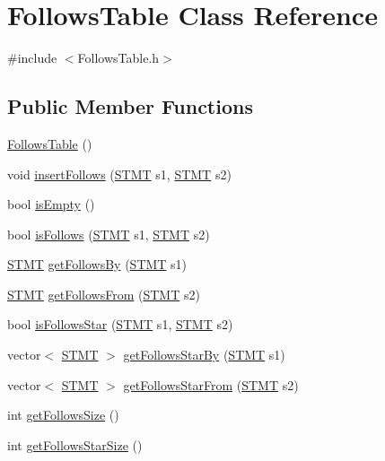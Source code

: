\hypertarget{class_follows_table}{\section{Follows\-Table Class Reference}
\label{class_follows_table}
}


{\ttfamily \#include $<$Follows\-Table.\-h$>$}

\subsection*{Public Member Functions}
\begin{DoxyCompactItemize}
\item 
\hyperlink{class_follows_table_a3f8037760cee7e5dc50a2df832f6c4ad}{Follows\-Table} ()
\item 
void \hyperlink{class_follows_table_a7bea1745b1f8b37e9ed96f5159116b8b}{insert\-Follows} (\hyperlink{std_afx_8h_a4a876b28ac3f59cecb39c2d2d76e4e7a}{S\-T\-M\-T} s1, \hyperlink{std_afx_8h_a4a876b28ac3f59cecb39c2d2d76e4e7a}{S\-T\-M\-T} s2)
\item 
bool \hyperlink{class_follows_table_a0eaf7b1c70730a6f658be07d1c6d60c4}{is\-Empty} ()
\item 
bool \hyperlink{class_follows_table_abe6692baa87cd5982996dd33400db8c1}{is\-Follows} (\hyperlink{std_afx_8h_a4a876b28ac3f59cecb39c2d2d76e4e7a}{S\-T\-M\-T} s1, \hyperlink{std_afx_8h_a4a876b28ac3f59cecb39c2d2d76e4e7a}{S\-T\-M\-T} s2)
\item 
\hyperlink{std_afx_8h_a4a876b28ac3f59cecb39c2d2d76e4e7a}{S\-T\-M\-T} \hyperlink{class_follows_table_aac4f2858b050a35ae0b351d5d2baee7b}{get\-Follows\-By} (\hyperlink{std_afx_8h_a4a876b28ac3f59cecb39c2d2d76e4e7a}{S\-T\-M\-T} s1)
\item 
\hyperlink{std_afx_8h_a4a876b28ac3f59cecb39c2d2d76e4e7a}{S\-T\-M\-T} \hyperlink{class_follows_table_a66ba94980e93271d5a99efe43915db76}{get\-Follows\-From} (\hyperlink{std_afx_8h_a4a876b28ac3f59cecb39c2d2d76e4e7a}{S\-T\-M\-T} s2)
\item 
bool \hyperlink{class_follows_table_ad68f64135cb00d8a29919bd924519fc6}{is\-Follows\-Star} (\hyperlink{std_afx_8h_a4a876b28ac3f59cecb39c2d2d76e4e7a}{S\-T\-M\-T} s1, \hyperlink{std_afx_8h_a4a876b28ac3f59cecb39c2d2d76e4e7a}{S\-T\-M\-T} s2)
\item 
vector$<$ \hyperlink{std_afx_8h_a4a876b28ac3f59cecb39c2d2d76e4e7a}{S\-T\-M\-T} $>$ \hyperlink{class_follows_table_a016f03c806ce676c62b51c623d549659}{get\-Follows\-Star\-By} (\hyperlink{std_afx_8h_a4a876b28ac3f59cecb39c2d2d76e4e7a}{S\-T\-M\-T} s1)
\item 
vector$<$ \hyperlink{std_afx_8h_a4a876b28ac3f59cecb39c2d2d76e4e7a}{S\-T\-M\-T} $>$ \hyperlink{class_follows_table_ab77cdda2c13684c54934884161a673c3}{get\-Follows\-Star\-From} (\hyperlink{std_afx_8h_a4a876b28ac3f59cecb39c2d2d76e4e7a}{S\-T\-M\-T} s2)
\item 
int \hyperlink{class_follows_table_aab1f1d34e0bb591d4c3020ff39b249e1}{get\-Follows\-Size} ()
\item 
int \hyperlink{class_follows_table_a3d0dee4e4c0c1d46b4548543a7a2b830}{get\-Follows\-Star\-Size} ()
\end{DoxyCompactItemize}


